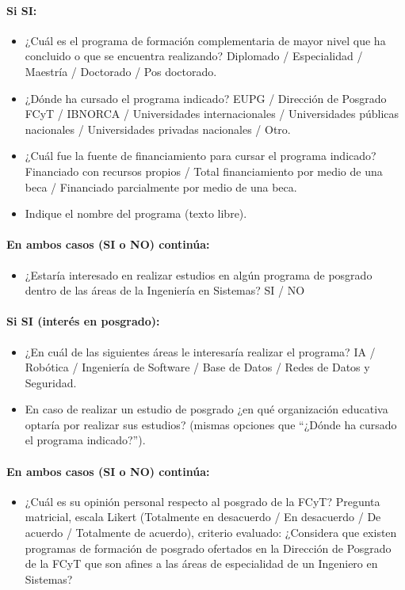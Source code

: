 \documentclass[12pt]{article}
\begin{document}
\paragraph{Si SI:}
\begin{itemize}[nosep]
    \item ¿Cuál es el programa de formación complementaria de mayor nivel
    que ha concluido o que se encuentra realizando? Diplomado /
    Especialidad / Maestría / Doctorado / Pos doctorado.
    \item ¿Dónde ha cursado el programa indicado? EUPG / Dirección de
    Posgrado FCyT / IBNORCA / Universidades internacionales /
    Universidades públicas nacionales / Universidades privadas nacionales
    / Otro.
    \item ¿Cuál fue la fuente de financiamiento para cursar el programa
    indicado? Financiado con recursos propios / Total financiamiento por
    medio de una beca / Financiado parcialmente por medio de una beca.
    \item Indique el nombre del programa (texto libre).
\end{itemize}

\paragraph{En ambos casos (SI o NO) continúa:}
\begin{itemize}[nosep]
    \item ¿Estaría interesado en realizar estudios en algún programa de
    posgrado dentro de las áreas de la Ingeniería en Sistemas? SI / NO
\end{itemize}

\paragraph{Si SI (interés en posgrado):}
\begin{itemize}[nosep]
    \item ¿En cuál de las siguientes áreas le interesaría realizar el
    programa? IA / Robótica / Ingeniería de Software / Base de Datos /
    Redes de Datos y Seguridad.
    \item En caso de realizar un estudio de posgrado ¿en qué organización
    educativa optaría por realizar sus estudios? (mismas opciones que
    ``¿Dónde ha cursado el programa indicado?'').
\end{itemize}

\paragraph{En ambos casos (SI o NO) continúa:}
\begin{itemize}[nosep]
    \item ¿Cuál es su opinión personal respecto al posgrado de la FCyT?
    Pregunta matricial, escala Likert (Totalmente en desacuerdo / En
    desacuerdo / De acuerdo / Totalmente de acuerdo), criterio evaluado:
    ¿Considera que existen programas de formación de posgrado ofertados
    en la Dirección de Posgrado de la FCyT que son afines a las áreas de
    especialidad de un Ingeniero en Sistemas?
\end{itemize}
\end{document}
